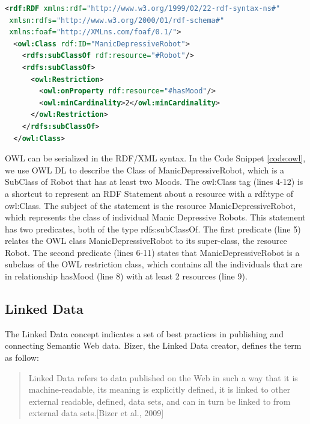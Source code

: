 \begin{lstlisting}[language=XML, caption=An example of a simple OWL DL RDF/XML document:, label=code:owl]
<rdf:RDF xmlns:rdf="http://www.w3.org/1999/02/22-rdf-syntax-ns#"
 xmlsn:rdfs="http://www.w3.org/2000/01/rdf-schema#"
 xmlns:foaf="http://XMLns.com/foaf/0.1/">
  <owl:Class rdf:ID="ManicDepressiveRobot">
    <rdfs:subClassOf rdf:resource="#Robot"/>
    <rdfs:subClassOf>
      <owl:Restriction>
        <owl:onProperty rdf:resource="#hasMood"/>
        <owl:minCardinality>2</owl:minCardinality>
      </owl:Restriction>
    </rdfs:subClassOf>
  </owl:Class>
\end{lstlisting}

OWL can be serialized in the RDF/XML syntax. In the Code Snippet \ref{code:owl}, we use OWL DL to describe the Class of ManicDepressiveRobot, which is a SubClass of Robot that has at least two Moods. The owl:Class tag (lines 4-12) is a shortcut to represent an RDF Statement about a resource with a rdf:type of owl:Class. The subject of the statement is the resource ManicDepressiveRobot, which represents the class of individual Manic Depressive Robots. This statement has two predicates, both of the type rdfs:subClassOf. The first predicate (line 5) relates the OWL class ManicDepressiveRobot to its super-class, the resource Robot. The second predicate (lines 6-11) states that ManicDepressiveRobot is a subclass of the OWL restriction class, which contains all the individuals that are in relationship hasMood (line 8) with at least 2 resources (line 9).


\subsection{Linked Data}\label{sec:ldata}

The Linked Data concept indicates a set of best practices in publishing and connecting Semantic Web data. Bizer, the Linked Data creator, defines the term as follow:

\begin{quote}
Linked Data refers to data published on the Web in such a way that it is machine-readable, its meaning is explicitly defined, it is linked to other external readable, defined, data sets, and can in turn be linked to from external data sets.[Bizer et al., 2009]
\end{quote} 

